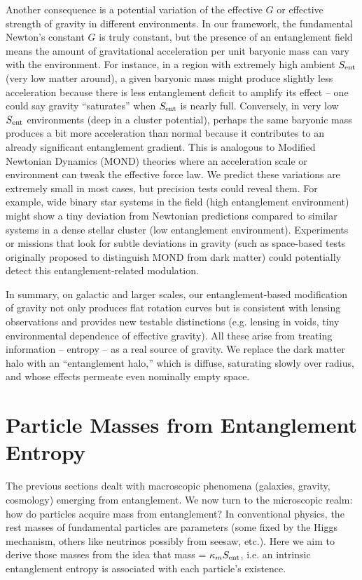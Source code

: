 \documentclass[11pt]{article}
\begin{document}
Another consequence is a potential variation of the effective $G$ or effective strength of gravity in different environments. In our framework, the fundamental Newton’s constant $G$ is truly constant, but the presence of an entanglement field means the amount of gravitational acceleration per unit baryonic mass can vary with the environment. For instance, in a region with extremely high ambient $S_{\rm ent}$ (very low matter around), a given baryonic mass might produce slightly less acceleration because there is less entanglement deficit to amplify its effect – one could say gravity “saturates” when $S_{\rm ent}$ is nearly full. Conversely, in very low $S_{\rm ent}$ environments (deep in a cluster potential), perhaps the same baryonic mass produces a bit more acceleration than normal because it contributes to an already significant entanglement gradient. This is analogous to Modified Newtonian Dynamics (MOND) theories where an acceleration scale or environment can tweak the effective force law. We predict these variations are extremely small in most cases, but precision tests could reveal them​. For example, wide binary star systems in the field (high entanglement environment) might show a tiny deviation from Newtonian predictions compared to similar systems in a dense stellar cluster (low entanglement environment). Experiments or missions that look for subtle deviations in gravity (such as space-based tests originally proposed to distinguish MOND from dark matter) could potentially detect this entanglement-related modulation​.

In summary, on galactic and larger scales, our entanglement-based modification of gravity not only produces flat rotation curves but is consistent with lensing observations and provides new testable distinctions (e.g. lensing in voids, tiny environmental dependence of effective gravity). All these arise from treating information – entropy – as a real source of gravity. We replace the dark matter halo with an “entanglement halo,” which is diffuse, saturating slowly over radius, and whose effects permeate even nominally empty space.

\section{Particle Masses from Entanglement Entropy}

The previous sections dealt with macroscopic phenomena (galaxies, gravity, cosmology) emerging from entanglement. We now turn to the microscopic realm: how do particles acquire mass from entanglement? In conventional physics, the rest masses of fundamental particles are parameters (some fixed by the Higgs mechanism, others like neutrinos possibly from seesaw, etc.). Here we aim to derive those masses from the idea that mass = $\kappa_m S_{\rm ent}$, i.e. an intrinsic entanglement entropy is associated with each particle’s existence.
\end{document}
